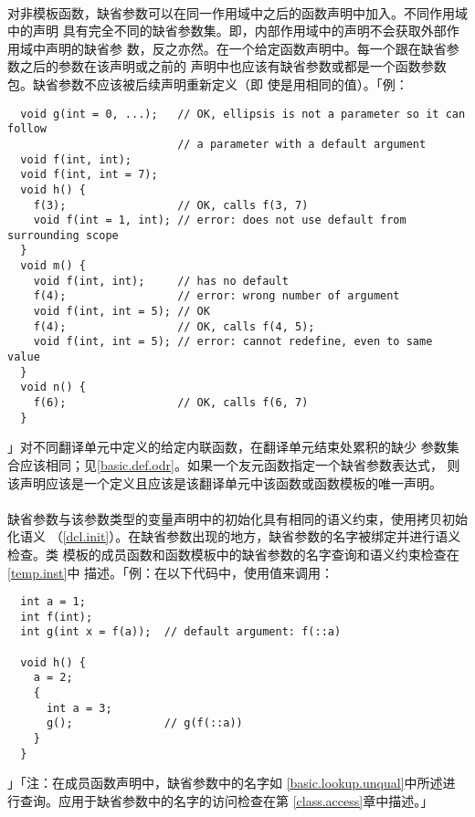 \paragraph{}
对非模板函数，缺省参数可以在同一作用域中之后的函数声明中加入。不同作用域中的声明
具有完全不同的缺省参数集。即，内部作用域中的声明不会获取外部作用域中声明的缺省参
数，反之亦然。在一个给定函数声明中。每一个跟在缺省参数之后的参数在该声明或之前的
声明中也应该有缺省参数或都是一个函数参数包。缺省参数不应该被后续声明重新定义（即
使是用相同的值）。「例：
\begin{lstlisting}
  void g(int = 0, ...);   // OK, ellipsis is not a parameter so it can follow
                          // a parameter with a default argument
  void f(int, int);
  void f(int, int = 7);
  void h() {
    f(3);                 // OK, calls f(3, 7)
    void f(int = 1, int); // error: does not use default from surrounding scope
  }
  void m() {
    void f(int, int);     // has no default
    f(4);                 // error: wrong number of argument
    void f(int, int = 5); // OK
    f(4);                 // OK, calls f(4, 5);
    void f(int, int = 5); // error: cannot redefine, even to same value
  }
  void n() {
    f(6);                 // OK, calls f(6, 7)
  }
\end{lstlisting}」对不同翻译单元中定义的给定内联函数，在翻译单元结束处累积的缺少
参数集合应该相同；见\ref{basic.def.odr}。如果一个友元函数指定一个缺省参数表达式，
则该声明应该是一个定义且应该是该翻译单元中该函数或函数模板的唯一声明。

\paragraph{}
缺省参数与该参数类型的变量声明中的初始化具有相同的语义约束，使用拷贝初始化语义
（\ref{dcl.init}）。在缺省参数出现的地方，缺省参数的名字被绑定并进行语义检查。类
模板的成员函数和函数模板中的缺省参数的名字查询和语义约束检查在\ref{temp.inst}中
描述。「例：在以下代码中，使用值来调用：
\begin{lstlisting}
  int a = 1;
  int f(int);
  int g(int x = f(a));  // default argument: f(::a)

  void h() {
    a = 2;
    {
      int a = 3;
      g();              // g(f(::a))
    }
  }
\end{lstlisting}」「注：在成员函数声明中，缺省参数中的名字如
\ref{basic.lookup.unqual}中所述进行查询。应用于缺省参数中的名字的访问检查在第
\ref{class.access}章中描述。」

